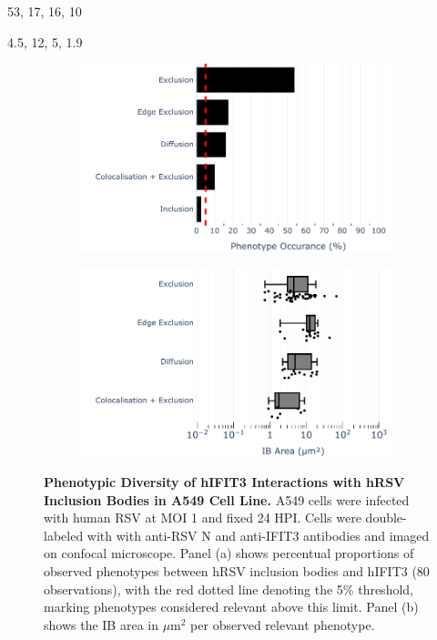 53, 17, 16, 10

4.5, 12, 5, 1.9

\lipsum[1-5]

\begin{figure}
    \begin{subfigure}{0.495\textwidth}
        \caption{}
        \includegraphics[width=1\linewidth]{08. Chapter 3/Figs/02. Infection/03. IFIT3/01. bar_i3_a549.pdf} 
    \end{subfigure}
    \begin{subfigure}{0.495\textwidth}
        \caption{}
        \includegraphics[width=1\linewidth]{08. Chapter 3/Figs/02. Infection/03. IFIT3/02. box_i3_a549.pdf}
    \end{subfigure}
    \caption[Phenotypic Diversity of hIFIT3 Interactions with hRSV Inclusion Bodies in A549 Cell Line.]{\textbf{Phenotypic Diversity of hIFIT3 Interactions with hRSV Inclusion Bodies in A549 Cell Line.} A549 cells were infected with human RSV at MOI 1 and fixed 24 HPI. Cells were double-labeled with with anti-RSV N and anti-IFIT3 antibodies and imaged on confocal microscope. Panel (a) shows percentual proportions of observed phenotypes between hRSV inclusion bodies and hIFIT3 (80 observations), with the red dotted line denoting the 5\% threshold, marking phenotypes considered relevant above this limit. Panel (b) shows the IB area in \(\mu \mbox{m}^2\) per observed relevant phenotype.}
    \label{fig:Phenotypic Diversity of hIFIT3 Interactions with hRSV Inclusion Bodies in A549 Cell Line}
\end{figure}

